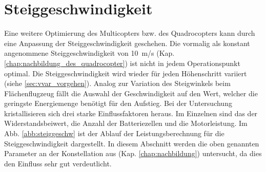 \section{Steiggeschwindigkeit}
\label{sec:steiggeschwindigkeit}
Eine weitere Optimierung des Multicopters bzw. des Quadrocopters kann durch eine Anpassung der Steiggeschwindigkeit geschehen. Die vormalig als konstant angenommene Steiggeschwindigkeit von \SI{10}{m/s} (Kap. \ref{chap:nachbildung_des_quadrocopter}) ist nicht in jedem Operationspunkt optimal. Die Steiggeschwindigkeit wird wieder für jeden Höhenschritt variiert (siehe \ref{sec:vvar_vorgehen}). Analog zur Variation des Steigwinkels beim Flächenflugzeug fällt die Auswahl der Geschwindigkeit auf den Wert, welcher die geringste Energiemenge benötigt für den Aufstieg. Bei der Untersuchung kristallisieren sich drei starke Einflussfaktoren heraus. Im Einzelnen sind das der Widerstandsbeiwert, die Anzahl der Batteriezellen und die Motorleistung. Im Abb. \ref{abb:steiggeschw} ist der Ablauf der Leistungsberechnung für die Steiggeschwindigkeit dargestellt. In diesem Abschnitt werden die oben genannten Parameter an der Konstellation aus (Kap. \ref{chap:nachbildung}) untersucht, da dies den Einfluss sehr gut verdeutlicht.


